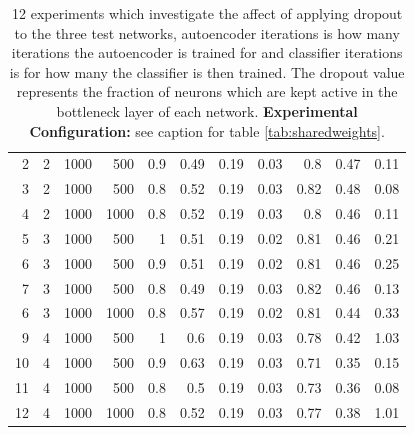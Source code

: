 \begin{table}[h]
{\begin{tabular}{rllrrrrrrrr}
      2                    & 2       & 1000             & 500       & 0.9      & 0.49     & 0.19      & 0.03      & 0.8                  & 0.47                 & 0.11                 \\
      3                    & 2       & 1000             & 500       & 0.8      & 0.52     & 0.19      & 0.03      & 0.82                 & 0.48                 & 0.08                 \\
      4                    & 2       & 1000             & 1000       & 0.8      & 0.52     & 0.19      & 0.03      & 0.8                  & 0.46                 & 0.11                 \\
      \hline
      5                    & 3       & 1000             & 500       & 1        & 0.51     & 0.19      & 0.02      & 0.81                 & 0.46                 & 0.21                 \\
      6                    & 3       & 1000             & 500       & 0.9      & 0.51     & 0.19      & 0.02      & 0.81                 & 0.46                 & 0.25                 \\
      7                    & 3       & 1000             & 500       & 0.8      & 0.49     & 0.19      & 0.03      & 0.82                 & 0.46                 & 0.13                 \\
      6                    & 3       & 1000             & 1000       & 0.8      & 0.57     & 0.19      & 0.02      & 0.81                 & 0.44                 & 0.33                 \\
      \hline
      9                    & 4       & 1000             & 500       & 1        & 0.6      & 0.19      & 0.03      & 0.78                 & 0.42                 & 1.03                 \\
      10                   & 4       & 1000             & 500       & 0.9      & 0.63     & 0.19      & 0.03      & 0.71                 & 0.35                 & 0.15                 \\
      11                   & 4       & 1000             & 500       & 0.8      & 0.5      & 0.19      & 0.03      & 0.73                 & 0.36                 & 0.08\\
      12                   & 4       & 1000             & 1000       & 0.8      & 0.52      & 0.19      & 0.03      & 0.77   & 0.38     & 1.01\\
      \hline
      \end{tabular}
      }
      \caption{12 experiments which investigate the affect of applying dropout to the
      three test networks, autoencoder iterations is how many iterations
      the autoencoder is trained for and classifier iterations is for how many the
      classifier is then trained. The dropout value represents the
      fraction of neurons which are kept active in the bottleneck layer of each network.
      {\bf Experimental Configuration:} see caption for table \ref{tab:sharedweights}.}
      \label{tab:dropout}
      \end{table}

